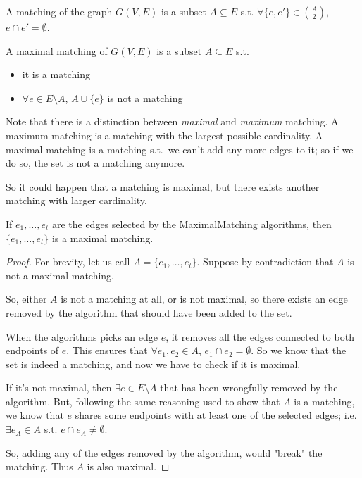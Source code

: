     \begin{definition}[Matching]
        A matching of the graph $G(V,E)$ is a subset $A \subseteq E$ s.t. $\forall \{ e,e' \} \in \binom{A}{2}$, $e \cap e' = \emptyset$.
    \end{definition}

    \begin{definition}
        A maximal matching of $G(V,E)$ is a subset $A \subseteq E$ s.t.
        \begin{itemize}
            \item it is a matching
            \item $\forall e \in E \setminus A$, $A \cup \{e\}$ is not a matching
        \end{itemize}
    \end{definition}

    Note that there is a distinction between \textit{maximal} and \textit{maximum} matching.
    A maximum matching is a matching with the largest possible cardinality.
    A maximal matching is a matching s.t.~we can't add any more edges to it; so if we do so, the set is not a matching anymore.

    So it could happen that a matching is maximal, but there exists another matching with larger cardinality.

    \begin{lemma}\label{lemma:vc1}
        If $e_1, \dots, e_t$ are the edges selected by the MaximalMatching algorithms, then $\{ e_1, \dots, e_t \}$ is a maximal matching.
    \end{lemma}

    \begin{proof}
        For brevity, let us call $A = \{ e_1, \dots, e_t \}$.
        Suppose by contradiction that $A$ is not a maximal matching.

        So, either $A$ is not a matching at all, or is not maximal, so there exists an edge removed by the algorithm that should have been added to the set.

        When the algorithms picks an edge $e$, it removes all the edges connected to both endpoints of $e$. This ensures that $\forall e_1,e_2 \in A$, $e_1 \cap e_2 = \emptyset$.
        So we know that the set is indeed a matching, and now we have to check if it is maximal.

        If it's not maximal, then $\exists e \in E \setminus A$ that has been wrongfully removed by the algorithm.
        But, following the same reasoning used to show that $A$ is a matching, we know that $e$ shares some endpoints with at least one of the selected edges; i.e. $\exists e_A \in A$ s.t. $e \cap e_A \neq \emptyset$.

        So, adding any of the edges removed by the algorithm, would "break" the matching. Thus $A$ is also maximal.
    \end{proof}

